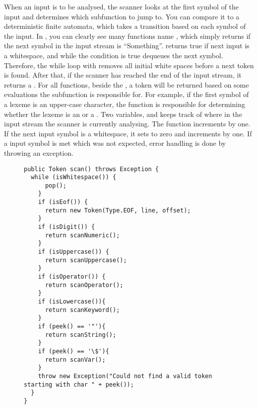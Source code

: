 When an input is to be analysed, the scanner looks at the first symbol of the input and determines which subfunction to jump to. You can compare it to a deterministic finite automata, which takes a transition based on each symbol of the input. In , you can clearly see many functions name , which simply returns if the next symbol in the input stream is ``Something''.  returns true if next input is a whitespace, and while the condition is true  dequeues the next symbol. Therefore, the while loop with  removes all initial white spaces before a next token is found. After that, if the scanner has reached the end of the input stream, it returns a . For all  functions, beside the , a token will be returned based on some evaluations the subfunction is responsible for. For example, if the first symbol of a lexeme is an upper-case character, the function  is responsible for determining whether the lexeme is an  or a . Two variables,   and   keeps track of where in the input stream the scanner is currently analysing. The function  increments  by one. If the next input symbol is a whitespace, it sets  to zero and increments  by one. If a input symbol is met which was not expected, error handling is done by throwing an exception. 

\begin{figure}
\begin{lstlisting}
public Token scan() throws Exception {
  while (isWhitespace()) {
      pop();
    }
    if (isEof()) {
      return new Token(Type.EOF, line, offset);
    }
    if (isDigit()) {
      return scanNumeric();
    }
    if (isUppercase()) {
      return scanUppercase();
    }
    if (isOperator()) {
      return scanOperator();
    }
    if (isLowercase()){
      return scanKeyword();
    }
    if (peek() == '"'){
      return scanString();
    }
    if (peek() == '\$'){
      return scanVar();
    }
    throw new Exception("Could not find a valid token starting with char " + peek());
  }
}
\end{lstlisting}
\label{lst:scan}
\end{figure}